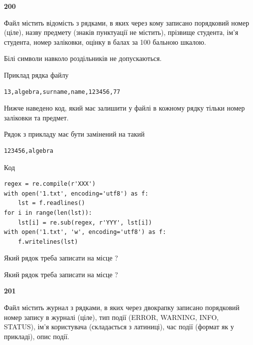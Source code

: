 \newpage

{\begin {center}\textbf{ 200}\end {center}}\par
Файл  містить відомість з рядками, в яких через кому записано поряд\-ковий номер (ціле), назву предмету (знаків пунктуації не містить), прізвище студента, ім'я студента, номер заліковки, оцінку в балах за 100 бальною шкалою.

Білі символи навколо роздільників не допускаються.

Приклад рядка файлу



\begin{verbatim}
13,algebra,surname,name,123456,77
\end{verbatim}


Нижче наведено код, який має залишити у файлі в кожному рядку тільки номер заліковки та предмет.

Рядок з прикладу має бути замінений на такий



\begin{verbatim}
123456,algebra
\end{verbatim}




Код



\begin{verbatim}
regex = re.compile(r'XXX')
with open('1.txt', encoding='utf8') as f:
    lst = f.readlines()
for i in range(len(lst)):
    lst[i] = re.sub(regex, r'YYY', lst[i])
with open('1.txt', 'w', encoding='utf8') as f:
    f.writelines(lst)
\end{verbatim}









Який рядок треба записати на місце  ?\par
\vspace{5mm}


Який рядок треба записати на місце  ?\par


\newpage

{\begin {center}\textbf{ 201}\end {center}}\par
Файл  містить журнал з рядками, в яких через двокрапку записано поряд\-ко\-вий номер запису в журналі (ціле), тип події (ERROR, WARNING, INFO, STATUS), ім'я користувача (складається з латиниці), час події (фор\-мат як у прикладі), опис події.

